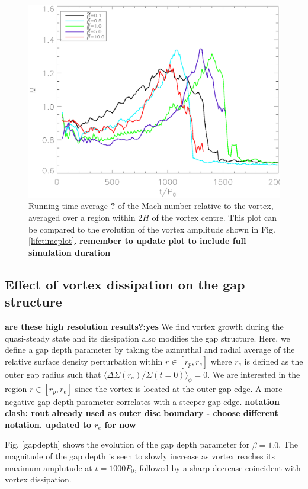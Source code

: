 \begin{figure}
    \includegraphics[width=\linewidth]{figures/mach}
 \caption{Running-time average {\bf ?} of the Mach number relative to
   the vortex, averaged over a region within $2H$ of the  
   vortex centre. This plot can be compared to the evolution of the
   vortex amplitude shown in Fig. \ref{lifetimeplot}.
   {\bf remember to update plot to include full simulation duration}
   \label{machplot}}
\end{figure}

\subsection{Effect of vortex dissipation on the gap structure} 
{\bf are these high resolution results?:yes}
We find vortex growth during the quasi-steady state and its dissipation
also modifies the gap structure. Here, we 
define a gap depth parameter by taking the azimuthal and radial average
of the relative surface density perturbation within $r\in[r_p,r_e]$ where
$r_{e}$ is defined as the outer gap radius such that 
$\langle\Delta \Sigma(r_e)/\Sigma(t=0)\rangle_{\phi}=0$. We are
interested in the region $r \in[r_p,r_e]$ since the vortex is
located at the outer gap edge. A more negative gap depth parameter
correlates with a steeper gap edge. 
{\bf notation clash: rout already used as outer disc boundary - choose
different notation. updated to $r_e$ for now}

Fig. \ref{gapdepth} shows the evolution of the gap depth parameter
for $\tilde\beta=1.0$. The magnitude of the gap depth is seen to 
slowly increase as vortex reaches its maximum amplutude at
$t=1000P_0$, followed by a sharp decrease coincident with vortex
dissipation.  

